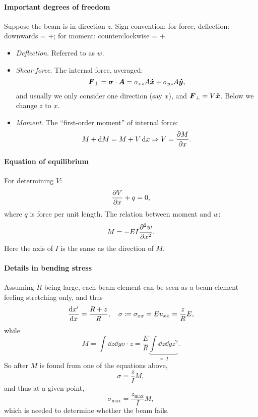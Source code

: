 \documentclass[hyperref, a4paper]{article}
\begin{document}
\paragraph*{Important degrees of freedom} Suppose the beam is in direction $z$.
Sign convention: for force, deflection: downwards = $+$; 
for moment: counterclockwise = $+$.
\begin{itemize}
    \item \emph{Deflection}. Referred to as $w$.
    \item \emph{Shear force}. The internal force, averaged: 
    \begin{equation}
        \vb*{F}_{\bot} = \vb*{\sigma} \cdot \vb*{A} 
        = \sigma_{xz} A \vu*{x} + \sigma_{yz} A \vu*{y},
    \end{equation}
    and usually we only consider one direction (say $x$), 
    and $\vb*{F}_\bot = V \vu*{x}$.
    Below we change $z$ to $x$.
    \item \emph{Moment}. The ``first-order moment'' of internal force:
    \begin{equation}
        M + \dd{M} = M + V \dd{x} \Rightarrow V = \pdv{M}{x}.
    \end{equation}
\end{itemize}

\paragraph*{Equation of equilibrium} For determining $V$: 
\begin{equation}
    \pdv{V}{x} + q = 0,
\end{equation}
where $q$ is force per unit length. 
The relation between moment and $w$:
\begin{equation}
    M = - EI \pdv[2]{w}{x}.
\end{equation}
Here the axis of $I$ is the same as the direction of $M$.

\paragraph*{Details in bending stress} Assuming $R$ being large,  
each beam element can be seen as a beam element feeling stretching only, 
and thus 
\begin{equation}
    \dv{x'}{x} = \frac{R+z}{R} , \quad \sigma \coloneqq \sigma_{xx} = E u_{xx} = \frac{z}{R} E,
\end{equation}
while 
\begin{equation}
    M = \int \dd{z} \dd{y} \sigma \cdot z 
    = \frac{E}{R} \underbrace{\int \dd{z} \dd{y} z^2}_{\eqqcolon I}.
\end{equation}    
So after $M$ is found from one of the equations above, 
\begin{equation}
    \sigma = \frac{z}{I} M,
\end{equation}
and thus at a given point, 
\begin{equation}
    \sigma_{\text{max}} = \frac{z_{\text{max}}}{I} M,
\end{equation}
which is needed to determine whether the beam fails.
\end{document}

